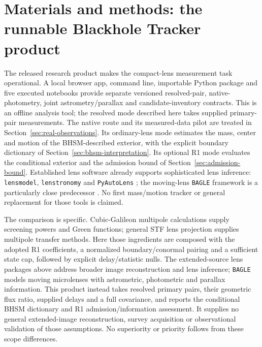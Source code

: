 \section{Materials and methods: the runnable Blackhole Tracker product}
\label{sec:product}

The released research product makes the compact-lens measurement task
operational. A local browser app, command line, importable Python package
and five executed notebooks provide separate versioned resolved-pair,
native-photometry, joint astrometry/parallax and candidate-inventory contracts.
This is an offline analysis tool; the
resolved mode described here takes supplied primary-pair measurements.
The native route and its measured-data pilot are treated in
Section~\ref{sec:real-observations}. Its
ordinary-lens mode estimates the mass, center and motion of the
BHSM-described exterior, with the explicit boundary dictionary of
Section~\ref{sec:bhsm-interpretation}. Its optional R1 mode evaluates the
conditional exterior and the admission bound of
Section~\ref{sec:admission-bound}. Established lens software already
supports sophisticated lens inference: \texttt{lensmodel},
\texttt{lenstronomy} and \texttt{PyAutoLens}
\cite{Keeton2001,Birrer2018,Nightingale2021}; the moving-lens
\texttt{BAGLE} framework is a particularly close predecessor
\cite{Lu2025}. No first mass/motion tracker or general replacement for
those tools is claimed.

The comparison is specific. Cubic-Galileon multipole calculations
\cite{Chu2013,Brito2014} supply screening powers and Green functions;
general STF lens projection \cite{Turyshev2022} supplies multipole
transfer methods. Here those ingredients are composed with the adopted
R1 coefficients, a normalized boundary/conormal pairing and a sufficient
state cap, followed by explicit delay/statistic nulls. The extended-source
lens packages above address broader image reconstruction and lens
inference; \texttt{BAGLE} models moving microlenses with astrometric,
photometric and parallax information. This product instead takes
resolved primary pairs, their geometric flux ratio, supplied delays and
a full covariance, and reports the conditional BHSM dictionary and R1
admission/information assessment. It supplies no general extended-image
reconstruction, survey acquisition or observational validation of those
assumptions. No superiority or priority follows from these scope differences.


